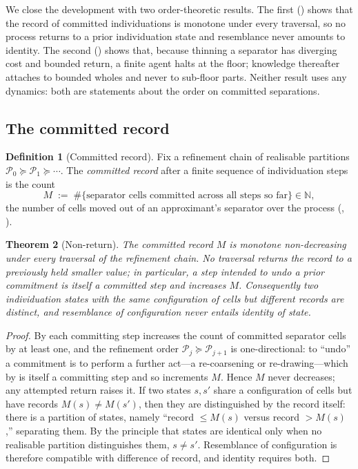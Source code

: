 \documentclass[11pt,a4paper]{article}
\theoremstyle{thmstyle}
\newtheorem{theorem}{Theorem}[section]
\theoremstyle{definition}
\newtheorem{definition}[theorem]{Definition}
\theoremstyle{remark}
\newcommand{\N}{\mathbb{N}}
\newcommand{\Part}{\mathscr{P}}
\begin{document}
We close the development with two order-theoretic results. The first
() shows that the record of committed individuations is
monotone under every traversal, so no process returns to a prior individuation
state and resemblance never amounts to identity. The second
() shows that, because thinning a separator has diverging
cost and bounded return, a finite agent halts at the floor; knowledge thereafter
attaches to bounded wholes and never to sub-floor parts. Neither result uses any
dynamics: both are statements about the order on committed separations.

\subsection{The committed record}

\begin{definition}[Committed record]
\label{def:record}
Fix a refinement chain of realisable partitions
$\Part_0\succeq\Part_1\succeq\cdots$. The \emph{committed record} after a finite
sequence of individuation steps is the count
\[
M\;:=\;\#\{\text{separator cells committed across all steps so far}\}\in\N,
\]
the number of cells moved out of an approximant's separator over the process
\textup{(}, \textup{)}.
\end{definition}

\begin{theorem}[Non-return]
\label{thm:nonreturn}
The committed record $M$ is monotone non-decreasing under every traversal of the
refinement chain. No traversal returns the record to a previously held smaller
value; in particular, a step intended to undo a prior commitment is itself a
committed step and increases $M$. Consequently two individuation states with the
same configuration of cells but different records are distinct, and resemblance
of configuration never entails identity of state.
\end{theorem}

\begin{proof}
By  each committing step increases the count of
committed separator cells by at least one, and the refinement order
$\Part_j\succeq\Part_{j+1}$ is one-directional: to ``undo'' a commitment is to
perform a further act---a re-coarsening or re-drawing---which by
 is itself a committing step and so increments $M$. Hence $M$
never decreases; any attempted return raises it. If two states $s,s'$ share a
configuration of cells but have records $M(s)\neq M(s')$, then they are
distinguished by the record itself: there is a partition of states, namely
``record $\le M(s)$ versus record $>M(s)$,'' separating them. By the principle
that states are identical only when no realisable partition distinguishes them,
$s\neq s'$. Resemblance of configuration is therefore compatible with difference
of record, and identity requires both.
\end{proof}
\end{document}
